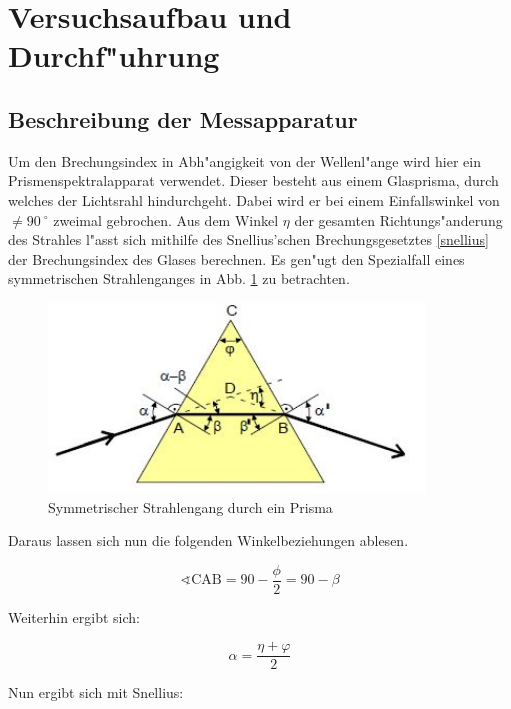 \section{Versuchsaufbau und Durchf"uhrung} %
\label{sec:durchfuehrung}

	\subsection{Beschreibung der Messapparatur} %
	\label{sub:beschreibung_der_messapparatur}
	
	Um den Brechungsindex in Abh"angigkeit von der Wellenl"ange wird hier ein Prismenspektralapparat verwendet. Dieser besteht aus einem Glasprisma, durch welches der Lichtsrahl hindurchgeht. Dabei wird er bei einem Einfallswinkel von $\neq \SI{90}{^\circ}$ zweimal gebrochen. Aus dem Winkel $\eta$  der gesamten Richtungs"anderung des Strahles l"asst sich mithilfe des Snellius'schen Brechungsgesetztes \ref{snellius} der Brechungsindex des Glases berechnen. Es gen"ugt den Spezialfall eines symmetrischen Strahlenganges in Abb. \ref{symmetrisch} zu betrachten. 

	\begin{figure}[!h]
		\centering
		\includegraphics[width = 10cm]{img/symmetrisch.JPG}
		\caption{Symmetrischer Strahlengang durch ein Prisma \cite{anleitung}}
		\label{symmetrisch}
	\end{figure}

	Daraus lassen sich nun die folgenden Winkelbeziehungen ablesen.

	\begin{equation}
		\sphericalangle\mathrm{CAB} = 90 -\frac{\phi}{2} = 90 - \beta
	\end{equation}

	Weiterhin ergibt sich:

	\begin{equation}
		\alpha = \frac{\eta + \varphi}{2}
	\end{equation}

	Nun ergibt sich mit Snellius:

